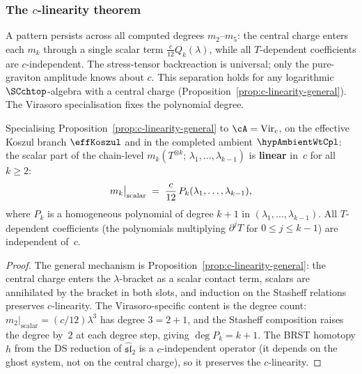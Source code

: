 \subsubsection*{The $c$-linearity theorem}

A pattern persists across all computed degrees $m_2$--$m_5$:
the central charge enters each $m_k$ through a single scalar
term $\frac{c}{12}Q_k(\lambda)$, while all $T$-dependent
coefficients are $c$-independent. The stress-tensor backreaction
is universal; only the pure-graviton amplitude knows about $c$.
This separation holds for any
logarithmic $\SCchtop$-algebra with a central charge
(Proposition~\ref{prop:c-linearity-general}). The Virasoro
specialisation fixes the polynomial degree.

\begin{theorem}
\label{thm:gravity-c-linearity}
Specialising Proposition~\ref{prop:c-linearity-general} to
\(\cA = \mathrm{Vir}_c\), on the effective Koszul branch
\(\effKoszul\) and in the completed ambient \(\hypAmbientWtCpl\):
the scalar part of the chain-level $m_k(T^{\otimes k};\,
\lambda_1, \ldots, \lambda_{k-1})$ is \textbf{linear} in~$c$
for all $k \ge 2$:
\begin{equation}\label{eq:gravity-c-linearity}
m_k\big|_{\textup{scalar}}
\;=\;
\frac{c}{12}\,P_k(\lambda_1, \ldots, \lambda_{k-1}),
\end{equation}
where $P_k$ is a homogeneous polynomial of degree $k+1$
in $(\lambda_1, \ldots, \lambda_{k-1})$. All
$T$-dependent coefficients (the polynomials multiplying
$\partial^j T$ for $0 \le j \le k-1$) are independent of~$c$.
\end{theorem}

\begin{proof}
The general mechanism is
Proposition~\ref{prop:c-linearity-general}: the central
charge enters the $\lambda$-bracket as a scalar contact term,
scalars are annihilated by the bracket in both slots, and
induction on the Stasheff relations preserves $c$-linearity.
The Virasoro-specific content is the degree count:
$m_2|_{\text{scalar}} = (c/12)\lambda^3$ has degree $3 = 2+1$,
and the Stasheff composition raises the degree by~$2$ at each
degree step, giving $\deg P_k = k+1$. The BRST homotopy $h$ from
the DS reduction of $\widehat{\mathfrak{sl}}_2$ is a
$c$-independent operator (it depends on the ghost system, not on
the central charge), so it preserves the $c$-linearity.
\end{proof}

